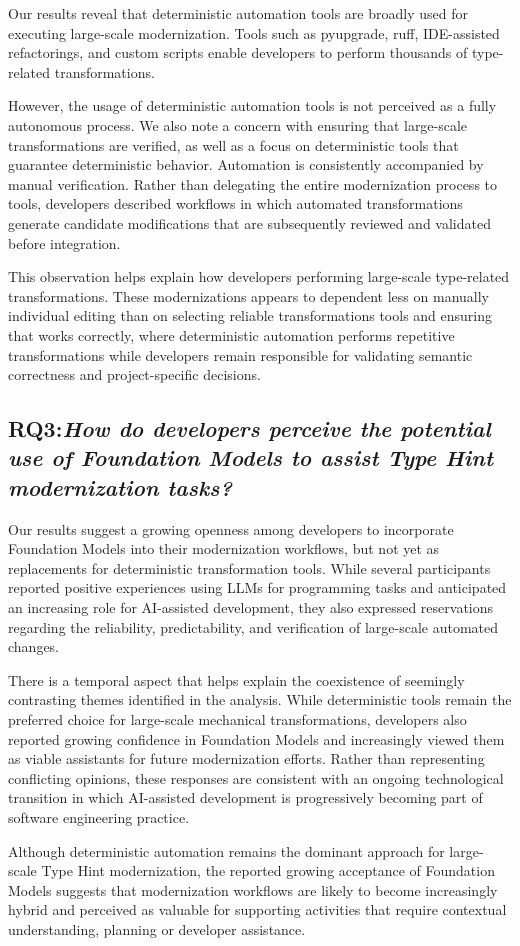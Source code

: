 Our results reveal that deterministic automation tools are broadly used for executing large-scale modernization. Tools such as pyupgrade, ruff, IDE-assisted refactorings, and custom scripts enable developers to perform thousands of type-related transformations.

However, the usage of deterministic automation tools is not perceived as a fully autonomous process. We also note a concern with ensuring that large-scale transformations are verified, as well as a focus on deterministic tools that guarantee deterministic behavior. Automation is consistently accompanied by manual verification. Rather than delegating the entire modernization process to tools, developers described workflows in which automated transformations generate candidate modifications that are subsequently reviewed and validated before integration.

This observation helps explain how developers performing large-scale type-related transformations. These modernizations appears to dependent less on manually individual editing than on selecting reliable transformations tools and ensuring that works correctly, where deterministic automation performs repetitive transformations while developers remain responsible for validating semantic correctness and project-specific decisions.

\subsection{RQ3:\textit{How do developers perceive the potential use of Foundation Models to assist Type Hint modernization tasks?}}

Our results suggest a growing openness among developers to incorporate Foundation Models into their modernization workflows, but not yet as replacements for deterministic transformation tools. While several participants reported positive experiences using LLMs for programming tasks and anticipated an increasing role for AI-assisted development, they also expressed reservations regarding the reliability, predictability, and verification of large-scale automated changes.

There is a temporal aspect that helps explain the coexistence of seemingly contrasting themes identified in the analysis. While deterministic tools remain the preferred choice for large-scale mechanical transformations, developers also reported growing confidence in Foundation Models and increasingly viewed them as viable assistants for future modernization efforts. Rather than representing conflicting opinions, these responses are consistent with an ongoing technological transition in which AI-assisted development is progressively becoming part of software engineering practice.

Although deterministic automation remains the dominant approach for large-scale Type Hint modernization, the reported growing acceptance of Foundation Models suggests that modernization workflows are likely to become increasingly hybrid and perceived as valuable for supporting activities that require contextual understanding, planning or developer assistance.
